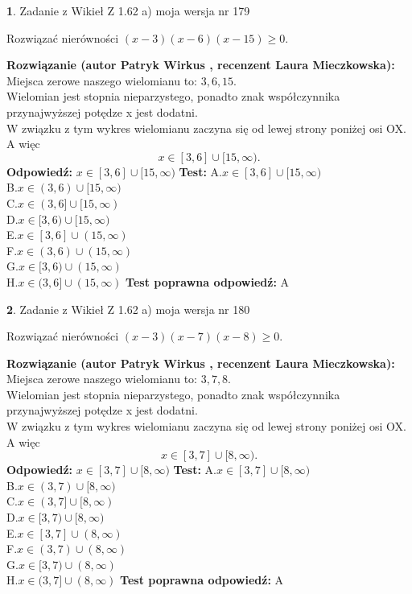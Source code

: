 \documentclass[12pt, a4paper]{article}
\theoremstyle{definition} %
\newtheorem{zad}{}
\newcommand{\zadStart}[1]{\begin{zad}#1\newline}
\newcommand{\zadStop}{\end{zad}}
\newcommand{\rozwStart}[2]{\noindent \textbf{Rozwiązanie (autor #1 , recenzent #2): }\newline}
\newcommand{\rozwStop}{\newline}
\newcommand{\odpStart}{\noindent \textbf{Odpowiedź:}\newline}
\newcommand{\odpStop}{\newline}
\newcommand{\testStart}{\noindent \textbf{Test:}\newline}
\newcommand{\testStop}{\newline}
\newcommand{\kluczStart}{\noindent \textbf{Test poprawna odpowiedź:}\newline}
\newcommand{\kluczStop}{\newline}
\begin{document}
\zadStart{Zadanie z Wikieł Z 1.62 a) moja wersja nr 179}

Rozwiązać nierówności $(x-3)(x-6)(x-15)\ge0$.
\zadStop
\rozwStart{Patryk Wirkus}{Laura Mieczkowska}
Miejsca zerowe naszego wielomianu to: $3, 6, 15$.\\
Wielomian jest stopnia nieparzystego, ponadto znak współczynnika przy\linebreak najwyższej potędze x jest dodatni.\\ W związku z tym wykres wielomianu zaczyna się od lewej strony poniżej osi OX. A więc $$x \in [3,6] \cup [15,\infty).$$
\rozwStop
\odpStart
$x \in [3,6] \cup [15,\infty)$
\odpStop
\testStart
A.$x \in [3,6] \cup [15,\infty)$\\
B.$x \in (3,6) \cup [15,\infty)$\\
C.$x \in (3,6] \cup [15,\infty)$\\
D.$x \in [3,6) \cup [15,\infty)$\\
E.$x \in [3,6] \cup (15,\infty)$\\
F.$x \in (3,6) \cup (15,\infty)$\\
G.$x \in [3,6) \cup (15,\infty)$\\
H.$x \in (3,6] \cup (15,\infty)$
\testStop
\kluczStart
A
\kluczStop



\zadStart{Zadanie z Wikieł Z 1.62 a) moja wersja nr 180}

Rozwiązać nierówności $(x-3)(x-7)(x-8)\ge0$.
\zadStop
\rozwStart{Patryk Wirkus}{Laura Mieczkowska}
Miejsca zerowe naszego wielomianu to: $3, 7, 8$.\\
Wielomian jest stopnia nieparzystego, ponadto znak współczynnika przy\linebreak najwyższej potędze x jest dodatni.\\ W związku z tym wykres wielomianu zaczyna się od lewej strony poniżej osi OX. A więc $$x \in [3,7] \cup [8,\infty).$$
\rozwStop
\odpStart
$x \in [3,7] \cup [8,\infty)$
\odpStop
\testStart
A.$x \in [3,7] \cup [8,\infty)$\\
B.$x \in (3,7) \cup [8,\infty)$\\
C.$x \in (3,7] \cup [8,\infty)$\\
D.$x \in [3,7) \cup [8,\infty)$\\
E.$x \in [3,7] \cup (8,\infty)$\\
F.$x \in (3,7) \cup (8,\infty)$\\
G.$x \in [3,7) \cup (8,\infty)$\\
H.$x \in (3,7] \cup (8,\infty)$
\testStop
\kluczStart
A
\kluczStop
\end{document}
